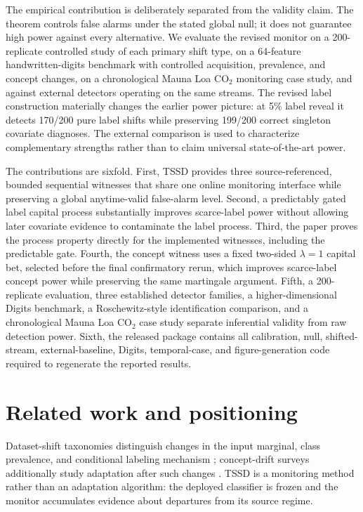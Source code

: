 \documentclass[11pt,a4paper]{article}
\theoremstyle{definition}
\newcommand{\1}{\mathbf{1}}
\begin{document}
The empirical contribution is deliberately separated from the validity claim. The theorem controls false alarms under the stated global null; it does not guarantee high power against every alternative. We evaluate the revised monitor on a 200-replicate controlled study of each primary shift type, on a 64-feature handwritten-digits benchmark with controlled acquisition, prevalence, and concept changes, on a chronological Mauna Loa CO$_2$ monitoring case study, and against external detectors operating on the same streams. The revised label construction materially changes the earlier power picture: at 5\% label reveal it detects 170/200 pure label shifts while preserving 199/200 correct singleton covariate diagnoses. The external comparison is used to characterize complementary strengths rather than to claim universal state-of-the-art power.

The contributions are sixfold. First, TSSD provides three source-referenced, bounded sequential witnesses that share one online monitoring interface while preserving a global anytime-valid false-alarm level. Second, a predictably gated label capital process substantially improves scarce-label power without allowing later covariate evidence to contaminate the label process. Third, the paper proves the process property directly for the implemented witnesses, including the predictable gate. Fourth, the concept witness uses a fixed two-sided $\lambda=1$ capital bet, selected before the final confirmatory rerun, which improves scarce-label concept power while preserving the same martingale argument. Fifth, a 200-replicate evaluation, three established detector families, a higher-dimensional Digits benchmark, a Roschewitz-style identification comparison, and a chronological Mauna Loa CO$_2$ case study separate inferential validity from raw detection power. Sixth, the released package contains all calibration, null, shifted-stream, external-baseline, Digits, temporal-case, and figure-generation code required to regenerate the reported results.

\section{Related work and positioning}
\label{sec:related}

Dataset-shift taxonomies distinguish changes in the input marginal, class prevalence, and conditional labeling mechanism \cite{quinonero2009,moreno2012}; concept-drift surveys additionally study adaptation after such changes \cite{gama2014,lu2019}. TSSD is a monitoring method rather than an adaptation algorithm: the deployed classifier is frozen and the monitor accumulates evidence about departures from its source regime.
\end{document}
